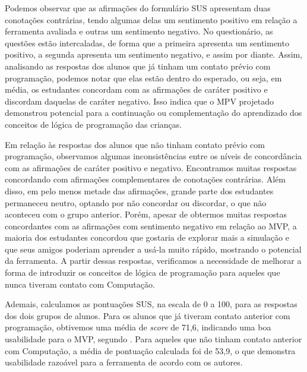 Podemos observar que as afirmações do formulário SUS apresentam duas conotações contrárias, tendo algumas delas um sentimento positivo em relação a ferramenta avaliada e outras um sentimento negativo. No questionário, as questões estão intercaladas, de forma que a primeira apresenta um sentimento positivo, a segunda apresenta um sentimento negativo, e assim por diante. Assim, analisando as respostas dos alunos que já tinham um contato prévio com programação, podemos notar que elas estão dentro do esperado, ou seja, em média, os estudantes concordam com as afirmações de caráter positivo e discordam daquelas de caráter negativo. Isso indica que o MPV projetado demonstrou potencial para a continuação ou complementação do aprendizado dos conceitos de lógica de programação das crianças.

Em relação às respostas dos alunos que não tinham contato prévio com programação, observamos algumas inconsistências entre os níveis de concordância com as afirmações de caráter positivo e negativo. Encontramos muitas respostas concordando com afirmações complementares de conotações contrárias. Além disso, em pelo menos metade das afirmações, grande parte dos estudantes permaneceu neutro, optando por não concordar ou discordar, o que não aconteceu com o grupo anterior. Porém, apesar de obtermos muitas respostas concordantes com as afirmações com sentimento negativo em relação ao MVP, a maioria dos estudantes concordou que gostaria de explorar mais a simulação e que seus amigos poderiam aprender a usá-la muito rápido, mostrando o potencial da ferramenta. A partir dessas respostas, verificamos a necessidade de melhorar a forma de introduzir os conceitos de lógica de programação para aqueles que nunca tiveram contato com Computação.

Ademais, calculamos as pontuações SUS, na escala de 0 a 100, para as respostas dos dois grupos de alunos. Para os alunos que já tiveram contato anterior com programação, obtivemos uma média de \textit{score} de 71,6, indicando uma boa usabilidade para o MVP, segundo \citet{bangor2009determining}. Para aqueles que não tinham contato anterior com Computação, a média de pontuação calculada foi de 53,9, o que demonstra usabilidade razoável para a ferramenta de acordo com os autores.

